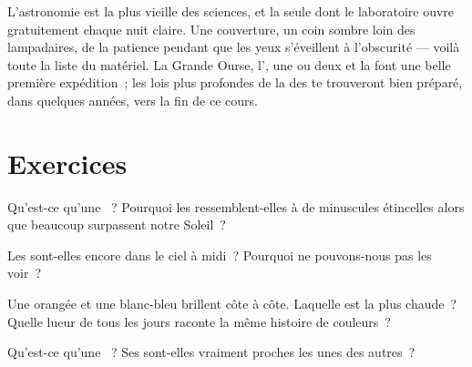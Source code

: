 \begin{remark}\label{rem:g5:stars-night-sky:lookup}
L'astronomie est la plus vieille des sciences, et la seule dont le
laboratoire ouvre gratuitement chaque nuit claire. Une couverture, un
coin sombre loin des lampadaires, de la patience pendant que les yeux
s'éveillent à l'obscurité --- voilà toute la liste du matériel. La
Grande Ourse, l', une  ou deux et la 
font une belle première expédition~; les lois plus profondes de la
 des  te trouveront bien préparé, dans quelques années,
vers la fin de ce cours.
\end{remark}

\section{Exercices}

\begin{exercise}[$\star$]\label{exo:g5:stars-night-sky:1}
Qu'est-ce qu'une ~? Pourquoi les  ressemblent-elles à de
minuscules étincelles alors que beaucoup surpassent notre Soleil~?
\end{exercise}

\begin{exercise}[$\star$]\label{exo:g5:stars-night-sky:2}
Les  sont-elles encore dans le ciel à midi~? Pourquoi ne
pouvons-nous pas les voir~?
\end{exercise}

\begin{exercise}[$\star$]\label{exo:g5:stars-night-sky:3}
Une  orangée et une  blanc-bleu brillent côte à côte.
Laquelle est la plus chaude~? Quelle lueur de tous les jours raconte
la même histoire de couleurs~?
\end{exercise}

\begin{exercise}[$\star$]\label{exo:g5:stars-night-sky:4}
Qu'est-ce qu'une ~? Ses  sont-elles vraiment
proches les unes des autres~?
\end{exercise}

